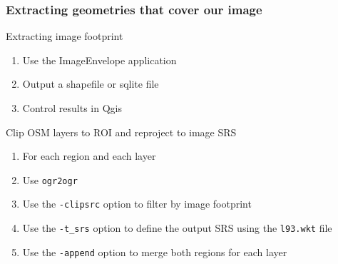 \documentclass[8pt]{beamer}
\begin{document}
\begin{frame}[fragile]
\frametitle{Extracting geometries that cover our image}
\begin{block}{Extracting image footprint}
\begin{enumerate}
\item Use the ImageEnvelope application
\item Output a shapefile or sqlite file
\item Control results in Qgis
\end{enumerate}
\end{block}

\begin{block}{Clip OSM layers to ROI and reproject to image SRS}
\begin{enumerate}
\item For each region and each layer
\item Use \texttt{ogr2ogr}
\item Use the \texttt{-clipsrc} option to filter by image footprint
\item Use the \texttt{-t\_srs} option to define the output SRS using the \texttt{l93.wkt} file
\item Use the \texttt{-append} option to merge both regions for each layer
\end{enumerate}
\end{block}

\end{frame}
\end{document}
